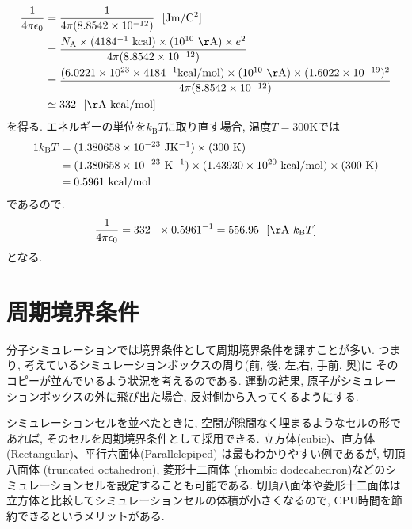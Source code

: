 \begin{align}
  \frac{1}{4 \pi \epsilon_{0}}
  &=
  \frac{1}{4 \pi (8.8542 \times 10^{-12})} ~~ [\mathrm{Jm/C^{2}}]
  \notag \\
  &=
  \frac
  {N_{\mathrm{A}} \times (4184^{-1} ~\mathrm{kcal}) \times (10^{10} ~\mathrm{\AA}) \times e^{2}}
  {4 \pi (8.8542 \times 10^{-12})}
  \notag \\
  &=
  \frac
  {(6.0221 \times 10^{23} \times 4184^{-1} \mathrm{kcal/mol}) \times (10^{10}~\mathrm{\AA}) \times (1.6022 \times 10^{-19})^{2}}
  {4 \pi (8.8542 \times 10^{-12})}
  \notag \\
  &\simeq
  332 ~~ \mathrm{[\AA~kcal/mol]}
  \notag
\end{align}
を得る. エネルギーの単位を$k_{\mathrm{B}}T$に取り直す場合, 温度$T=300$Kでは
\begin{align}
  1 k_{\mathrm{B}}T
  &=
  (1.380658 \times 10^{-23} ~\mathrm{JK^{-1}})
  \times
  (300~\mathrm{K})
  \notag \\
  &=
  (1.380658 \times 10^{-23} ~\mathrm{K^{-1}})
  \times
  (1.43930 \times 10^{20} ~\mathrm{kcal/mol})
  \times
  (300~\mathrm{K})
  \notag \\
  &=
  0.5961~\mathrm{kcal/mol}
  \notag
\end{align}
であるので.
\begin{align}
  \frac{1}{4 \pi \epsilon_{0}}
  =
  332 ~~ \times 0.5961^{-1}
  =
  556.95~~[\mathrm{\AA}~k_{\mathrm{B}}T]
  \notag
\end{align}
となる.

\section{周期境界条件}
分子シミュレーションでは境界条件として周期境界条件を課すことが多い.
つまり, 考えているシミュレーションボックスの周り(前, 後, 左,右, 手前, 奥)に
そのコピーが並んでいるよう状況を考えるのである.
運動の結果, 原子がシミュレーションボックスの外に飛び出た場合,
反対側から入ってくるようにする.

シミュレーションセルを並べたときに, 空間が隙間なく埋まるようなセルの形であれば, そのセルを周期境界条件として採用できる. 立方体(cubic)、直方体 (Rectangular)、平行六面体(Parallelepiped) は最もわかりやすい例であるが, 切頂八面体 (truncated octahedron), 菱形十二面体 (rhombic dodecahedron)などのシミュレーションセルを設定することも可能である\cite{2017Allen}. 
切頂八面体や菱形十二面体は立方体と比較してシミュレーションセルの体積が小さくなるので, CPU時間を節約できるというメリットがある\cite{2020GromacsManual}.

